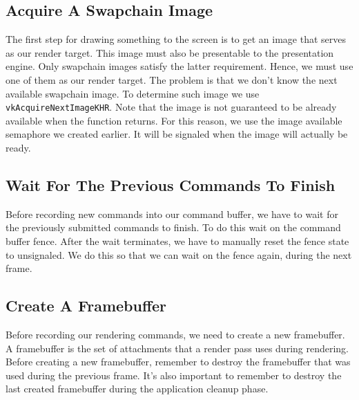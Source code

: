 \subsection{Acquire A Swapchain Image}

The first step for drawing something to the screen is to get an image that
serves as our render target.
This image must also be presentable to the presentation engine.
Only swapchain images satisfy the latter requirement.
Hence, we must use one of them as our render target.
The problem is that we don't know the next available swapchain image.
To determine such image we use \texttt{vkAcquireNextImageKHR}.
Note that the image is not guaranteed to be already available when
the function returns.
For this reason, we use the image available semaphore we created earlier.
It will be signaled when the image will actually be ready.

\begin{minipage}{\linewidth}{\noindent}
    
\end{minipage}

\subsection{Wait For The Previous Commands To Finish}

Before recording new commands into our command buffer, we have to wait
for the previously submitted commands to finish.
To do this wait on the command buffer fence.
After the wait terminates, we have to manually reset the fence state
to unsignaled.
We do this so that we can wait on the fence again, during the next frame.

\begin{minipage}{\linewidth}{\noindent}
    
\end{minipage}

\subsection{Create A Framebuffer}

Before recording our rendering commands, we need to create a new framebuffer.
A framebuffer is the set of attachments that a render pass uses during rendering.
Before creating a new framebuffer, remember to destroy the framebuffer that was used
during the previous frame.
It's also important to remember to destroy the last created framebuffer during
the application cleanup phase.

